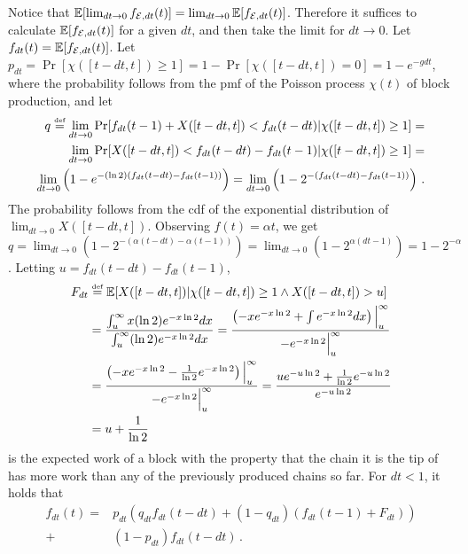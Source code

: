 Notice that $\mathop{{}\mathbb{E}}[\lim_{dt \to 0} f_{\mathcal{E},dt}(t)] = \lim_{dt \to 0} \mathop{{}\mathbb{E}}[f_{\mathcal{E},dt}(t)]$.
Therefore it suffices to calculate $\mathop{{}\mathbb{E}}[f_{\mathcal{E},dt}(t)]$ for a given $dt$,
and then take the limit for $dt \to 0$.
Let $f_{dt}(t) = \mathop{{}\mathbb{E}}[f_{\mathcal{E},dt}(t)]$.
Let $p_{dt} = \Pr[\chi([t - dt, t]) \geq 1] = 1 - \Pr[\chi([t - dt, t]) = 0] = 1 - e^{-g dt}$, where
the probability follows from the pmf of the Poisson process $\chi(t)$
of block production,
and let
\begin{align*}
  q \stackrel{\text{\tiny def}}{=} \lim_{dt \to 0} \Pr[f_{dt}(t - 1) + X([t - dt, t]) < f_{dt}(t - dt)|\chi([t - dt, t]) \geq 1] =\\
           \lim_{dt \to 0} \Pr[X([t - dt, t]) < f_{dt}(t - dt) - f_{dt}(t - 1)|\chi([t - dt, t]) \geq 1] = \\
           \lim_{dt \to 0} \left( 1 - e^{-(\ln2) (f_{dt}(t - dt) - f_{dt}(t - 1))}\right) =
           \lim_{dt \to 0} \left(1 - 2^{-(f_{dt}(t - dt) - f_{dt}(t - 1))}\right)
  \,.
\end{align*}
The probability follows from the cdf of the exponential distribution of $\lim_{dt \to 0} X([t - dt, t])$.
Observing $f(t) = \alpha t$, we get $q = \lim_{dt \to 0}\left(1 - 2^{-(\alpha(t - dt) - \alpha(t - 1))}\right)
= \lim_{dt \to 0}\left(1 - 2^{\alpha (dt - 1)}\right) = 1 - 2^{-\alpha}$.
Letting $u = f_{dt}(t - dt) - f_{dt}(t - 1)$,
\begin{align*}
  F_{dt} &\stackrel{\text{\tiny def}}{=} \mathop{{}\mathbb{E}}[X([t - dt, t])|\chi([t - dt, t]) \geq 1 \land X([t - dt, t]) > u]\\
         &= \frac{\int_u^\infty x (\ln2) e^{-x \ln2} dx}{\int_u^\infty (\ln2) e^{-x \ln2} dx}
          = \frac{\left(-x e^{-x \ln2} + \int{e^{-x \ln2} dx}\right)\Big|_u^\infty}{-e^{-x \ln2}\Big|_u^\infty}\\
         &= \frac{\left(-x e^{-x \ln2} - \frac{1}{\ln2} e^{-x \ln2}\right)\Big|_u^\infty}{-e^{-x \ln2}\Big|_u^\infty}
          = \frac{u e^{-u\ln2} + \frac{1}{\ln2} e^{-u \ln2}}{e^{-u \ln2}}\\
         &= u + \frac{1}{\ln2}\,
\end{align*}
is the expected work of a block with the property that the chain it is the tip of has more work than any of the
previously produced chains so far.
For $dt < 1$, it holds that
\begin{align*}
  f_{dt}(t) =
      &p_{dt}\left(q_{dt}f_{dt}(t - dt) + (1 - q_{dt})(f_{dt}(t - 1) + F_{dt})\right)\\
    + &(1 - p_{dt})f_{dt}(t - dt)\,.
\end{align*}
